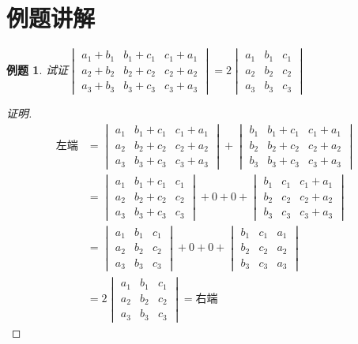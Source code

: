 \documentclass[a4paper]{book}
\newtheorem{eg}{例题}[chapter]
\begin{document}

\section{例题讲解}

\begin{eg}
试证$\begin{vmatrix} a_1+b_1 & b_1+c_1 & c_1+a_1 \\ a_2+b_2 & b_2+c_2 & c_2+a_2 \\ a_3+b_3 & b_3+c_3 & c_3+a_3 \end{vmatrix} = 2\begin{vmatrix} a_1 & b_1 & c_1 \\ a_2 & b_2 & c_2 \\ a_3 & b_3 & c_3 \end{vmatrix}$
\end{eg}
\begin{proof}[证明]
\begin{align*}
\text{左端} & = \begin{vmatrix} a_1 & b_1+c_1 & c_1+a_1 \\ a_2 & b_2+c_2 & c_2+a_2 \\ a_3 & b_3+c_3 & c_3+a_3 \end{vmatrix} + \begin{vmatrix} b_1 & b_1+c_1 & c_1+a_1 \\ b_2 & b_2+c_2 & c_2+a_2 \\ b_3 & b_3+c_3 & c_3+a_3 \end{vmatrix} \\
& = \begin{vmatrix} a_1 & b_1+c_1 & c_1 \\ a_2 & b_2+c_2 & c_2 \\ a_3 & b_3+c_3 & c_3 \end{vmatrix} + 0 + 0 + \begin{vmatrix} b_1 & c_1 & c_1+a_1 \\ b_2 & c_2 & c_2+a_2 \\ b_3 & c_3 & c_3+a_3 \end{vmatrix} \\
& = \begin{vmatrix} a_1 & b_1 & c_1 \\ a_2 & b_2 & c_2 \\ a_3 & b_3 & c_3 \end{vmatrix} + 0 + 0 + \begin{vmatrix} b_1 & c_1 & a_1 \\ b_2 & c_2 & a_2 \\ b_3 & c_3 & a_3 \end{vmatrix} \\
& = 2\begin{vmatrix} a_1 & b_1 & c_1 \\ a_2 & b_2 & c_2 \\ a_3 & b_3 & c_3 \end{vmatrix} = \text{右端}
\end{align*}
\end{proof}
\end{document}
